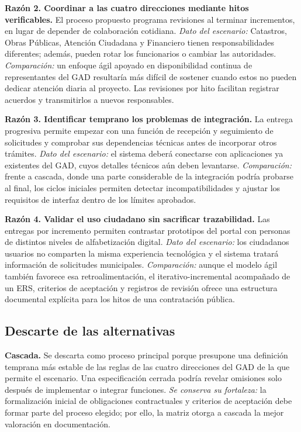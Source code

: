 \documentclass[conference,onecolumn]{IEEEtran}
\begin{document}
\noindent\textbf{Razón 2. Coordinar a las cuatro direcciones mediante hitos verificables.} El proceso propuesto programa revisiones al terminar incrementos, en lugar de depender de colaboración cotidiana. \emph{Dato del escenario:} Catastros, Obras Públicas, Atención Ciudadana y Financiero tienen responsabilidades diferentes; además, pueden rotar los funcionarios o cambiar las autoridades. \emph{Comparación:} un enfoque ágil apoyado en disponibilidad continua de representantes del GAD resultaría más difícil de sostener cuando estos no pueden dedicar atención diaria al proyecto. Las revisiones por hito facilitan registrar acuerdos y transmitirlos a nuevos responsables.

\noindent\textbf{Razón 3. Identificar temprano los problemas de integración.} La entrega progresiva permite empezar con una función de recepción y seguimiento de solicitudes y comprobar sus dependencias técnicas antes de incorporar otros trámites. \emph{Dato del escenario:} el sistema deberá conectarse con aplicaciones ya existentes del GAD, cuyos detalles técnicos aún deben levantarse. \emph{Comparación:} frente a cascada, donde una parte considerable de la integración podría probarse al final, los ciclos iniciales permiten detectar incompatibilidades y ajustar los requisitos de interfaz dentro de los límites aprobados.

\noindent\textbf{Razón 4. Validar el uso ciudadano sin sacrificar trazabilidad.} Las entregas por incremento permiten contrastar prototipos del portal con personas de distintos niveles de alfabetización digital. \emph{Dato del escenario:} los ciudadanos usuarios no comparten la misma experiencia tecnológica y el sistema tratará información de solicitudes municipales. \emph{Comparación:} aunque el modelo ágil también favorece esa retroalimentación, el iterativo-incremental acompañado de un ERS, criterios de aceptación y registros de revisión ofrece una estructura documental explícita para los hitos de una contratación pública.

\subsection{Descarte de las alternativas}

\noindent\textbf{Cascada.} Se descarta como proceso principal porque presupone una definición temprana más estable de las reglas de las cuatro direcciones del GAD de la que permite el escenario. Una especificación cerrada podría revelar omisiones solo después de implementar o integrar funciones. \emph{Se conserva su fortaleza:} la formalización inicial de obligaciones contractuales y criterios de aceptación debe formar parte del proceso elegido; por ello, la matriz otorga a cascada la mejor valoración en documentación.
\end{document}
